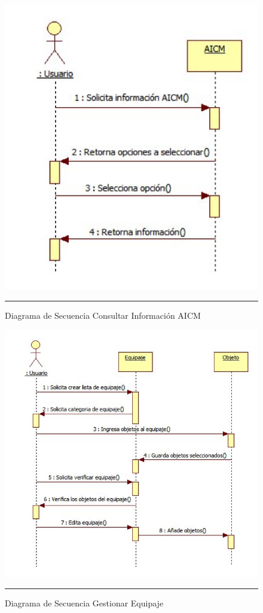 \begin{figure}[h]
	\centering
		\includegraphics[width=1\textwidth]{Figuras/secConsultarInformacionAICM.png}
		\rule{30em}{0.5pt}
	\caption[Diagrama de Secuencia Consultar Información AICM]{Diagrama de Secuencia Consultar Información AICM}
	\label{fig:secConsultarInformacionAICM}
\end{figure}

\begin{figure}[h]
	\centering
		\includegraphics[width=1\textwidth]{Figuras/secGestionarEquipaje.png}
		\rule{30em}{0.5pt}
	\caption[Diagrama de Secuencia Gestionar Equipaje]{Diagrama de Secuencia Gestionar Equipaje}
	\label{fig:secGestionarEquipaje}
\end{figure}


